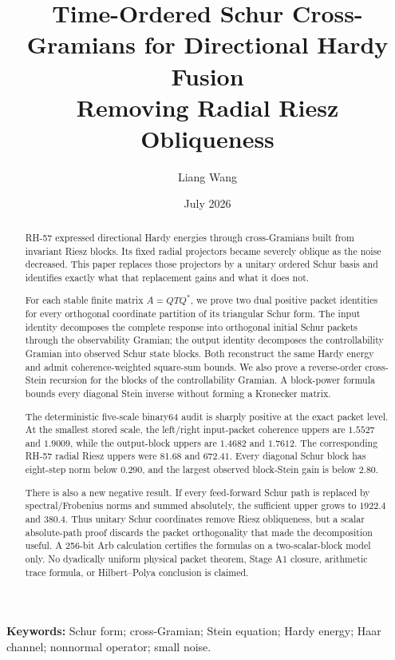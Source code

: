 \documentclass[11pt]{article}
\title{Time-Ordered Schur Cross-Gramians for Directional Hardy Fusion\\
\large Removing Radial Riesz Obliqueness}
\author{Liang Wang}
\date{July 2026}
\theoremstyle{remark}
\begin{document}
\maketitle

\begin{abstract}
RH-57 expressed directional Hardy energies through cross-Gramians built from
invariant Riesz blocks.  Its fixed radial projectors became severely oblique
as the noise decreased.  This paper replaces those projectors by a unitary
ordered Schur basis and identifies exactly what that replacement gains and
what it does not.

For each stable finite matrix $A=QTQ^*$, we prove two dual positive packet
identities for every orthogonal coordinate partition of its triangular Schur
form.  The input identity decomposes the complete response into
orthogonal initial Schur packets through the observability Gramian; the output
identity decomposes the controllability Gramian into observed Schur state
blocks.  Both reconstruct the same Hardy energy and admit coherence-weighted
square-sum bounds.  We also prove a reverse-order cross-Stein recursion for
the blocks of the controllability Gramian.  A block-power formula bounds every
diagonal Stein inverse without forming a Kronecker matrix.

The deterministic five-scale binary64 audit is sharply positive at the exact
packet level.  At the smallest stored scale, the left/right input-packet
coherence uppers are $1.5527$ and $1.9009$, while the output-block uppers are
$1.4682$ and $1.7612$.  The corresponding RH-57 radial Riesz uppers were
$81.68$ and $672.41$.  Every diagonal Schur block has eight-step norm below
$0.290$, and the largest observed block-Stein gain is below $2.80$.

There is also a new negative result.  If every feed-forward Schur path is
replaced by spectral/Frobenius norms and summed absolutely, the sufficient
upper grows to $1922.4$ and $380.4$.  Thus unitary Schur coordinates remove
Riesz obliqueness, but a scalar absolute-path proof discards the packet
orthogonality that made the decomposition useful.  A 256-bit Arb calculation
certifies the formulas on a two-scalar-block model only.  No dyadically
uniform physical packet theorem, Stage A1 closure, arithmetic trace formula,
or Hilbert--Polya conclusion is claimed.
\end{abstract}

\noindent\textbf{Keywords:} Schur form; cross-Gramian; Stein equation;
Hardy energy; Haar channel; nonnormal operator; small noise.
\end{document}
